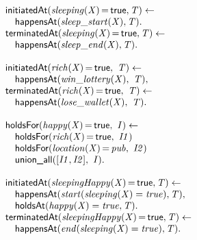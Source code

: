 \documentclass[8pt]{beamer}
\DeclareMathOperator{\val}{=}  %
\def \patsize {}
\def\happensAt{\textsf{\patsize happensAt}}
\def\holdsAt{\textsf{\patsize holdsAt}}
\def\holdsFor{\textsf{\patsize holdsFor}}
\def\initiatedAt{\textsf{\patsize initiatedAt}}
\def\terminatedAt{\textsf{\patsize terminatedAt}}
\def\unionall{\textsf{\patsize union\_all}}
\def\true{\textsf{\patsize true}}
\newenvironment{mysplit}%
  {\arraycolsep 0pt \begin{array}{l}}%
  {\end{array}}
\begin{document}
\begin{frame}
\begin{minipage}{0.48\linewidth}
        \begin{align*}
            \begin{mysplit}
                \initiatedAt\mathit{(sleeping(X)\val\true,T) \leftarrow}\\
                \quad    \happensAt\mathit{(sleep\_start(X),T).}\\
                \terminatedAt\mathit{(sleeping(X)\val\true,T) \leftarrow}\\
                \quad    \happensAt\mathit{(sleep\_end(X),T).}\\\\
                \initiatedAt\mathit{(rich(X)\val\true,\ T) \leftarrow}\\
                \quad    \happensAt\mathit{(win\_lottery(X),\ T),}\\
                \terminatedAt\mathit{(rich(X)\val\true,\ T) \leftarrow}\\
                \quad    \happensAt\mathit{(lose\_wallet(X),\ T)}.\\\\
                \holdsFor\mathit{(happy(X)\val\true,\ I) \leftarrow}\\
                \quad    \holdsFor\mathit{(rich(X)\val\true,\ I1)}\\
                \quad    \holdsFor\mathit{(location(X)\val pub,\ I2)}\\
                \quad    \unionall\mathit{([I1,I2],\ I)}.\\\\
                \initiatedAt\mathit{(sleepingHappy(X)\val\true,T) \leftarrow}\\
                \quad    \happensAt\mathit{(start(sleeping(X)=true),T),}\\
                \quad    \holdsAt\mathit{(happy(X)=true,T).}\\
                \terminatedAt\mathit{(sleepingHappy(X)\val\true,T) \leftarrow}\\
                \quad    \happensAt\mathit{(end(sleeping(X)=true),T).}\\\\
            \end{mysplit}
        \end{align*}
    \end{minipage}
\end{frame}
\end{document}
